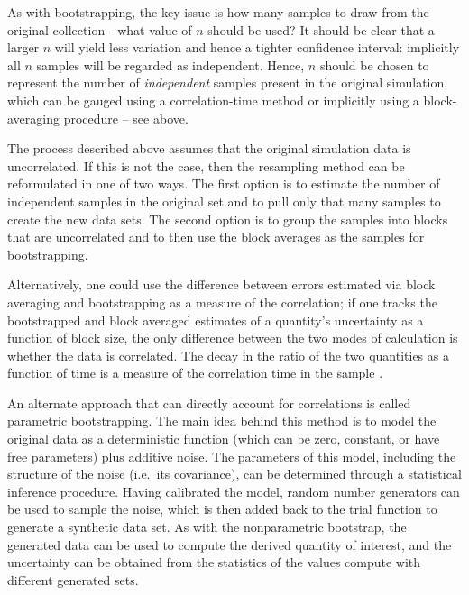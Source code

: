 As with bootstrapping, the key issue is how many samples to draw from the original collection - what value of $n$ should be used?  It should be clear that a larger $n$ will yield less variation and hence a tighter confidence interval: implicitly all $n$ samples will be regarded as independent.  Hence, $n$ should be chosen to represent the number of \emph{independent} samples present in the original simulation, which can be gauged using a correlation-time method \cite{Chodera-2016,Lyman2007a} or implicitly using a block-averaging procedure -- see above.

The process described above assumes that the original simulation data is uncorrelated.  If this is not the case, then the resampling method can be reformulated in one of two ways.  The first option is to estimate the number of independent samples in the original set and to pull only that many samples to create the new data sets.  The second option is to group the samples into blocks that are uncorrelated and to then use the block averages as the samples for bootstrapping.

Alternatively, one could use the difference between errors estimated via block averaging and bootstrapping as a measure of the correlation; if one tracks the bootstrapped and block averaged estimates of a quantity's uncertainty as a function of block size, the only difference between the two modes of calculation is whether the data is correlated.  The decay in the ratio of the two quantities as a function of time is a measure of the correlation time in the sample \cite{Romo2011}.

An alternate approach that can directly account for correlations is called parametric bootstrapping.  The main idea behind this method is to model the original data as a deterministic function (which can be zero, constant, or have free parameters) plus additive noise.  The parameters of this model, including the structure of the noise (i.e.\ its covariance), can be determined through a statistical inference procedure.  Having calibrated the model, random number generators can be used to sample the noise, which is then added back to the trial function to generate a synthetic data set.   As with the nonparametric bootstrap, the generated data can be used to compute the derived quantity of interest, and the uncertainty can be obtained from the statistics of the values compute with different generated sets.

